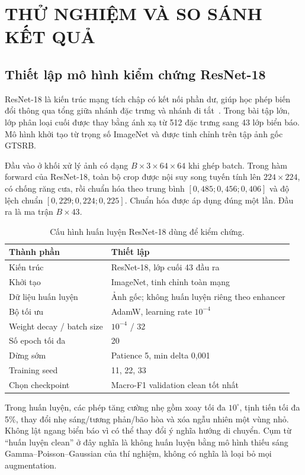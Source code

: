 \section{THỬ NGHIỆM VÀ SO SÁNH KẾT QUẢ}
\subsection{Thiết lập mô hình kiểm chứng ResNet-18}
ResNet-18 là kiến trúc mạng tích chập có kết nối phần dư, giúp học phép biến đổi thông qua tổng giữa nhánh đặc trưng và nhánh đi tắt~\cite{resnet}. Trong bài tập lớn, lớp phân loại cuối được thay bằng ánh xạ từ 512 đặc trưng sang 43 lớp biển báo. Mô hình khởi tạo từ trọng số ImageNet và được tinh chỉnh trên tập ảnh gốc GTSRB.

Đầu vào ở khối xử lý ảnh có dạng $B\times3\times64\times64$ khi ghép batch. Trong hàm forward của ResNet-18, toàn bộ crop được nội suy song tuyến tính lên $224\times224$, có chống răng cưa, rồi chuẩn hóa theo trung bình $[0,485;0,456;0,406]$ và độ lệch chuẩn $[0,229;0,224;0,225]$. Chuẩn hóa được áp dụng đúng một lần. Đầu ra là ma trận $B\times43$.

\par
\begin{table}[htbp]
\centering
\caption{Cấu hình huấn luyện ResNet-18 dùng để kiểm chứng.}
\begin{tabular}{P{6.1cm}P{8.0cm}}
\toprule
Thành phần & Thiết lập \\
\midrule
Kiến trúc & ResNet-18, lớp cuối 43 đầu ra \\
Khởi tạo & ImageNet, tinh chỉnh toàn mạng \\
Dữ liệu huấn luyện & Ảnh gốc; không huấn luyện riêng theo enhancer \\
Bộ tối ưu & AdamW, learning rate $10^{-4}$ \\
Weight decay / batch size & $10^{-4}$ / 32 \\
Số epoch tối đa & 20 \\
Dừng sớm & Patience 5, min delta 0,001 \\
Training seed & 11, 22, 33 \\
Chọn checkpoint & Macro-F1 validation clean tốt nhất \\
\bottomrule
\end{tabular}
\end{table}\par


Trong huấn luyện, các phép tăng cường nhẹ gồm xoay tối đa $10^\circ$, tịnh tiến tối đa 5\%, thay đổi nhẹ sáng/tương phản/bão hòa và xóa ngẫu nhiên một vùng nhỏ. Không lật ngang biển báo vì có thể thay đổi ý nghĩa hướng di chuyển. Cụm từ ``huấn luyện clean'' ở đây nghĩa là không huấn luyện bằng mô hình thiếu sáng Gamma--Poisson--Gaussian của thí nghiệm, không có nghĩa là loại bỏ mọi augmentation.

